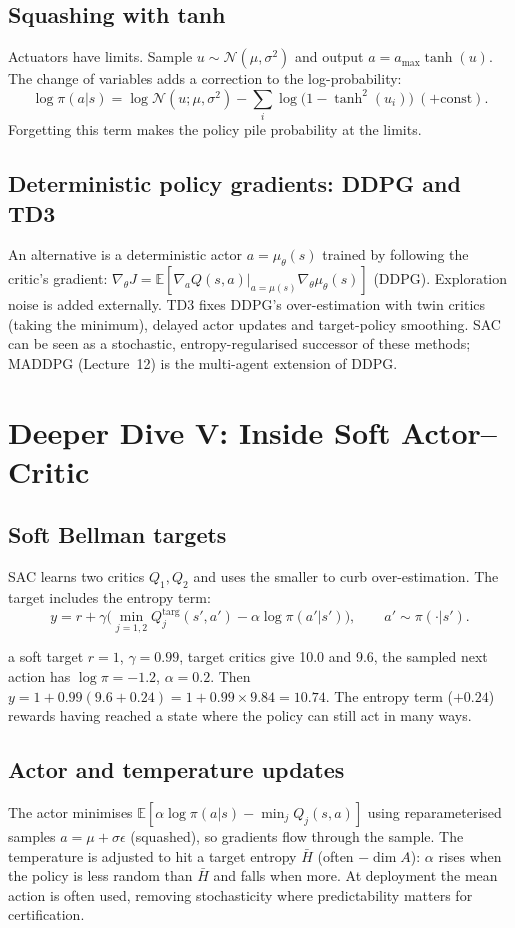 \documentclass[11pt]{article}
\begin{document}
\subsection{Squashing with tanh}
Actuators have limits. Sample $u\sim\mathcal N(\mu,\sigma^2)$ and output $a=a_{\max}\tanh(u)$. The change of variables adds a correction to the log-probability:
\[\log\pi(a|s)=\log\mathcal N(u;\mu,\sigma^2)-\sum_i\log\big(1-\tanh^2(u_i)\big)\ (+\text{const}).\]
Forgetting this term makes the policy pile probability at the limits.

\subsection{Deterministic policy gradients: DDPG and TD3}
An alternative is a deterministic actor $a=\mu_\theta(s)$ trained by following the critic's gradient: $\nabla_\theta J=\mathbb E[\nabla_aQ(s,a)|_{a=\mu(s)}\nabla_\theta\mu_\theta(s)]$ (DDPG). Exploration noise is added externally. TD3 fixes DDPG's over-estimation with twin critics (taking the minimum), delayed actor updates and target-policy smoothing. SAC can be seen as a stochastic, entropy-regularised successor of these methods; MADDPG (Lecture~12) is the multi-agent extension of DDPG.

\section{Deeper Dive V: Inside Soft Actor--Critic}
\subsection{Soft Bellman targets}
SAC learns two critics $Q_1,Q_2$ and uses the smaller to curb over-estimation. The target includes the entropy term:
\[y=r+\gamma\Big(\min_{j=1,2}Q_j^{\text{targ}}(s',a')-\alpha\log\pi(a'|s')\Big),\qquad a'\sim\pi(\cdot|s').\]
\begin{example}{a soft target}
$r=1$, $\gamma=0.99$, target critics give 10.0 and 9.6, the sampled next action has $\log\pi=-1.2$, $\alpha=0.2$. Then $y=1+0.99(9.6+0.24)=1+0.99\times9.84=10.74$. The entropy term ($+0.24$) rewards having reached a state where the policy can still act in many ways.
\end{example}
\subsection{Actor and temperature updates}
The actor minimises $\mathbb E[\alpha\log\pi(a|s)-\min_jQ_j(s,a)]$ using reparameterised samples $a=\mu+\sigma\epsilon$ (squashed), so gradients flow through the sample. The temperature is adjusted to hit a target entropy $\bar H$ (often $-\dim A$): $\alpha$ rises when the policy is less random than $\bar H$ and falls when more. At deployment the mean action is often used, removing stochasticity where predictability matters for certification.
\end{document}
